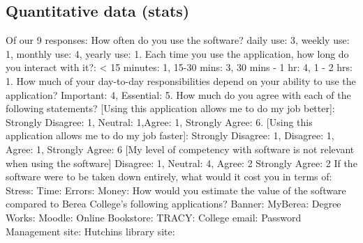 \subsection{Quantitative data (stats)}
Of our 9 responses: %
How often do you use the software? daily use: 3, weekly use: 1, monthly use: 4, yearly use: 1.
Each time you use the  application, how long do you interact with it?: < 15 minutes: 1, 15-30 mins: 3, 30 mins - 1 hr: 4, 1 - 2 hrs: 1.
How much of your day-to-day responsibilities depend on your ability to use the  application? Important: 4, Essential: 5.
How much do you agree with each of the following statements?
[Using this application allows me to do my job better]: Strongly Disagree: 1, Neutral: 1,Agree: 1, Strongly Agree: 6.
[Using this application allows me to do my job faster]: Strongly Disagree: 1, Disagree: 1, Agree: 1, Strongly Agree: 6
[My level of competency with software is not relevant when using the software] Disagree: 1, Neutral: 4, Agree: 2 Strongly Agree: 2
If the software were to be taken down entirely, what would it cost you in terms of:
Stress:
Time:
Errors:
Money:
How would you estimate the value of the software compared to Berea College's following applications?
Banner:
MyBerea:
Degree Works:
Moodle:
Online Bookstore:
TRACY:
College email:
Password Management site:
Hutchins library site:
